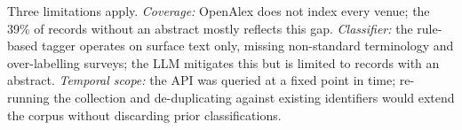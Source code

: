\documentclass[11pt]{article}
\begin{document}
Three limitations apply. \emph{Coverage:} OpenAlex does not index every venue; the
39\% of records without an abstract mostly reflects this gap. \emph{Classifier:} the
rule-based tagger operates on surface text only, missing non-standard terminology
and over-labelling surveys; the LLM mitigates this but is limited to records with an
abstract. \emph{Temporal scope:} the API was queried at a fixed point in time;
re-running the collection and de-duplicating against existing identifiers would
extend the corpus without discarding prior classifications.
\end{document}
